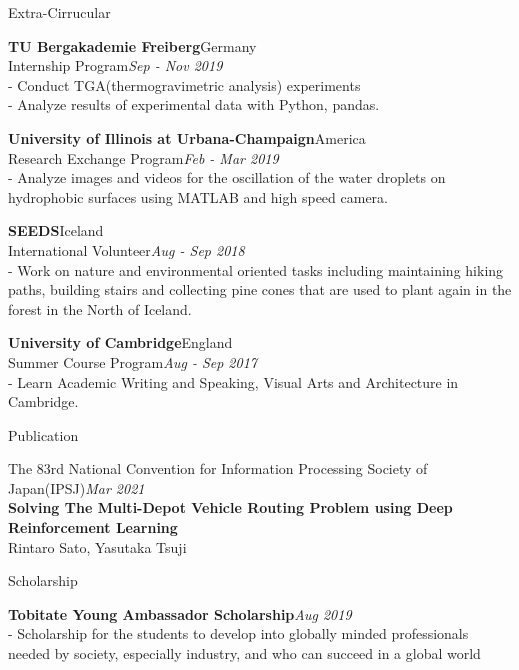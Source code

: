 \documentclass{resume} %
\begin{document}
\begin{rSection}{Extra-Cirrucular} 
\item {\bf TU Bergakademie Freiberg}\hfill {Germany}\\Internship Program\hfill {\em Sep - Nov 2019}\\- Conduct TGA(thermogravimetric analysis) experiments\\- Analyze results of experimental data with Python, pandas.
\item {\bf University of Illinois at Urbana-Champaign}\hfill {America}\\Research Exchange Program\hfill {\em Feb - Mar 2019}\\- Analyze images and videos for the oscillation of the water droplets on hydrophobic surfaces using MATLAB and high speed camera.
\item {\bf SEEDS}\hfill {Iceland}\\International Volunteer\hfill {\em Aug - Sep 2018}\\- Work on nature and environmental oriented tasks including maintaining hiking paths, building stairs and collecting pine cones that are used to plant again in the forest in the North of Iceland.
\item {\bf University of Cambridge}\hfill {England}\\Summer Course Program\hfill {\em Aug - Sep 2017}\\- Learn Academic Writing and Speaking, Visual Arts and Architecture in Cambridge.
\end{rSection}


\begin{rSection}{Publication}
 \item The 83rd National Convention for Information Processing Society of Japan(IPSJ)\hfill {\em Mar 2021}\\{\bf Solving The Multi-Depot Vehicle Routing Problem using Deep Reinforcement Learning}\\\hfill {Rintaro Sato, Yasutaka Tsuji}
\end{rSection}

\begin{rSection}{Scholarship}
 \item {\bf Tobitate Young Ambassador Scholarship}\hfill {\em Aug 2019}\\- Scholarship for the students to develop into globally minded professionals needed by society, especially industry, and who can succeed in a global world

\end{rSection}
\end{document}
